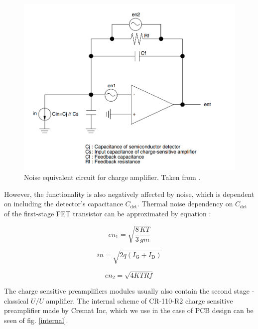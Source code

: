 \begin{figure}[H]
 \centering
 \includegraphics[scale=0.4, angle = 0]{./pictures/NoiseEquiv.png}
 \caption{Noise equivalent circuit for charge amplifier. Taken from \cite{charge}.}
 \label{trans}
 
\end{figure}


However, the functionality is also negatively affected by noise, which is dependent on including the detector's capacitance $C_{\textrm{det}}$. Thermal noise dependency on $C_{\textrm{det}}$ of the first-stage FET transistor can be approximated by equation \cite{charge}:

\begin{equation}
en_1 = \sqrt{\frac{8}{3}\frac{KT}{gm}}
\end{equation}


\begin{equation}
in = \sqrt{2q(I_{\textrm{G}} + I_{\textrm{D}})}
\end{equation}

\begin{equation}
en_2 = \sqrt{4KTRf}
\end{equation}


\par
The charge sensitive preamplifiers modules usually also contain the second stage - classical $U/U$ amplifier. The internal scheme of CR-110-R2 charge sensitive preamplifier made by Cremat Inc, which we use in the case of PCB design can be seen of fig. \ref{internal}.

